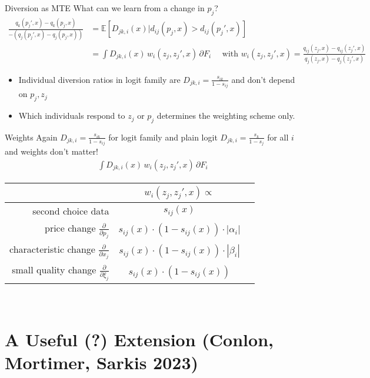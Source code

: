 \begin{frame}{Diversion as MTE}
\footnotesize
What can we learn from a change in $p_j$?
\begin{align*}
 \frac{q_k(p_j',x) - q_k(p_j,x)}{-\left(q_j(p_j',x) - q_j(p_j,x)\right)}&=\mathbb{E}[D_{jk,i}(x) | d_{ij}(p_j,x) > d_{ij}(p_j',x)]\\
&= \int D_{jk,i}(x) \, w_i(z_j,z_j',x)  \, \partial F_i \quad \mbox{ with } w_i(z_j,z_j',x) = \frac{q_{ij}(z_j,x)- q_{ij}(z_j',x) }{q_j(z_j,x)- q_j(z_j',x)}
\end{align*}
\begin{itemize}
\item Individual diversion ratios in logit family are $D_{jk,i} = \frac{s_{ik}}{1-s_{ij}}$ and don't depend on $p_j,z_j$
\item Which individuals respond to $z_j$ or $p_j$ determines the weighting scheme only.
\end{itemize}
\end{frame}

\begin{frame}{Weights}
Again $D_{jk,i} = \frac{s_{ik}}{1-s_{ij}}$ for logit family and plain logit $D_{jk,i} = \frac{s_{k}}{1-s_{j}}$ for all $i$ and weights don't matter!
\begin{align*}
\int D_{jk,i}(x) \, w_i(z_j,z_j',x)  \, \partial F_i 
\end{align*}
\begin{center}
\begin{tabular}{rcc} 
& $w_i(z_j,z_j',x) \propto$ \\
\midrule second choice data & $s_{i j}(x)$ \\
price change $\frac{\partial}{\partial p_{j}}$ & $s_{i j}(x) \cdot\left(1-s_{i j}(x)\right) \cdot\left|\alpha_{i}\right|$ \\
characteristic change $\frac{\partial}{\partial x_{j}}$ & $s_{i j}(x) \cdot\left(1-s_{i j}(x)\right) \cdot\left|\beta_{i}\right|$ \\
small quality change $\frac{\partial}{\partial \xi_{j}}$ & $s_{i j}(x) \cdot\left(1-s_{i j}(x)\right)$ \\
\midrule
\end{tabular}\\
\end{center}
\end{frame}

\section{A Useful (?) Extension (Conlon, Mortimer, Sarkis 2023)}




